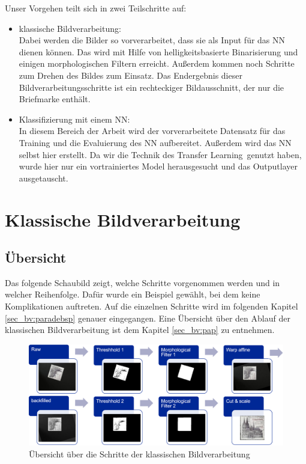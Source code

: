 \documentclass[12pt,toc=bib,toc=listof]{scrreprt}
\begin{document}
Unser Vorgehen teilt sich in zwei Teilschritte auf:
\begin{itemize}
\item klassische Bildverarbeitung:\\ 
Dabei werden die Bilder so vorverarbeitet, dass sie als Input für das NN dienen können. Das wird mit Hilfe von helligkeitsbasierte Binarisierung und einigen morphologischen Filtern erreicht. Außerdem kommen noch Schritte zum Drehen des Bildes zum Einsatz. Das Endergebnis dieser Bildverarbeitungsschritte ist ein rechteckiger Bildausschnitt, der nur die Briefmarke enthält.

\item Klassifizierung mit einem NN:\\
In diesem Bereich der Arbeit wird der vorverarbeitete Datensatz für das Training und die Evaluierung des NN aufbereitet. Außerdem wird das NN selbst hier erstellt. Da wir die Technik des \dq Transfer Learning\dq\ genutzt haben, wurde hier nur ein vortrainiertes Model herausgesucht und das Outputlayer ausgetauscht.

\end{itemize}



\chapter{Klassische Bildverarbeitung} %
\label{sec:klass_bv}

\section{Übersicht}
\label{sec_bv:übersicht}
Das folgende Schaubild zeigt, welche Schritte vorgenommen werden und in welcher Reihenfolge. Dafür wurde ein Beispiel gewählt, bei dem keine Komplikationen auftreten. Auf die einzelnen Schritte wird im folgenden Kapitel \ref{sec_bv:paradebsp} genauer eingegangen. Eine Übersicht über den Ablauf der klassischen Bildverarbeitung ist dem Kapitel \ref{sec_bv:pap} zu entnehmen.

\begin{figure}[h]
\includegraphics[width=\textwidth]{./../bilder/bv_overview.png}
\caption{Übersicht über die Schritte der klassischen Bildverarbeitung}
\label{fig:bv_overview}
\end{figure}
\end{document}

